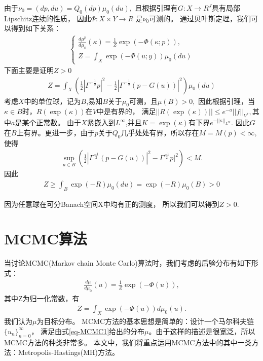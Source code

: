 \documentclass[a4paper,12pt,oneside,CJK]{cctbook}
\theoremstyle{definition}
\numberwithin{equation}{section}
\begin{document}
由于$\nu_0=(dp,du)=Q_0(dp)\mu_0(du),$ 且根据引理有$G:X\rightarrow R^J$具有局部Lipschitz连续的性质，
因此$\Phi:X\times Y\rightarrow R$ 是$\nu_0$可测的。
通过贝叶斯定理，我们可以得到如下关系：
\begin{eqnarray*}
    \left\{
    \begin{array}{ll}
    \frac{d\mu^p}{d\mu_0}(\kappa)=\frac{1}{Z}\exp(-\Phi(\kappa;p)),\\
    Z=\int_X \exp(-\Phi(u;y))\mu_0(d u)
    \end{array}
    \right.
\end{eqnarray*}
下面主要是证明$Z>0$
\begin{eqnarray*}
   Z=\int_X (\frac{1}{2}|\Gamma^{-\frac{1}{2}}p|^2-\frac{1}{2}|\Gamma^{-\frac{1}{2}}(p-G(u))|^2)\mu_0 (du)
\end{eqnarray*}
考虑$X$中的单位球，记为$B$,易知$B$关于$\mu_0$可测，且$\mu(B)>0,$
因此根据引理，当$\kappa\in B$时，$R(\exp(\kappa))$在$V$中是有界的，
满足$||R(\exp(\kappa))||\leq e^{-a} ||f||_{V^*},$其中$a$是某个正常数。
由于$X$紧嵌入到$L^{\infty}$,并且$K=\exp(\kappa)$有下界$e^{-||\kappa||_{L^{\infty}}}.$
因此$G$在$B$上有界。更进一步，由于$p$关于$Q_0$几乎处处有界，所以存在$M=M(p)<\infty,$
使得
\begin{eqnarray*}
   \sup_{u\in B}(\frac{1}{2}|\Gamma^{\frac{-1}{2}}(p-G(u))|^2-\Gamma^{\frac{-1}{2}}p|^2)<M.
\end{eqnarray*}
因此
\begin{eqnarray*}
   Z\geq \int_B \exp(-R)\mu_0(du)=\exp(-R)\mu_0(B)>0
\end{eqnarray*}

因为任意球在可分Banach空间X中均有正的测度，
所以我们可以得到$Z>0.$

\section{MCMC算法}

当讨论MCMC(Markov chain Monte Carlo)算法时，我们考虑的后验分布有如下形式：
\begin{eqnarray}\label{eq-MCMC1}
   \frac{d\mu}{d\mu_0}(u)=\frac{1}{Z}\exp(-\Phi(u)),
\end{eqnarray}
其中Z为归一化常数，有
\begin{eqnarray*}
    Z=\int_X \exp(-\Phi(u))d\mu_0(u).
\end{eqnarray*}
我们认为$\mu$为目标分布。
MCMC方法的基本思想是简单的：设计一个马尔科夫链$\{u_n\}_{n=0}^{\infty}$，
满足由式\ref{eq-MCMC1}给出的分布$\mu$。由于这样的描述是很宽泛，所以MCMC方法的种类非常多。
本文中，我们将重点运用MCMC方法中的其中一类方法：Metropolis-Hastings(MH)方法。
\end{document}

